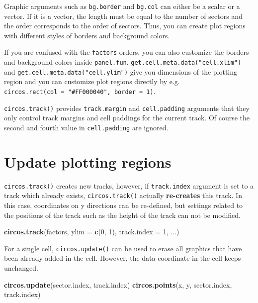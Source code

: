 \documentclass[]{book}
\newenvironment{Shaded}{\begin{snugshade}}{\end{snugshade}}
\newcommand{\KeywordTok}[1]{\textcolor[rgb]{0.13,0.29,0.53}{\textbf{#1}}}
\newcommand{\DataTypeTok}[1]{\textcolor[rgb]{0.13,0.29,0.53}{#1}}
\newcommand{\DecValTok}[1]{\textcolor[rgb]{0.00,0.00,0.81}{#1}}
\newcommand{\NormalTok}[1]{#1}
\begin{document}
Graphic arguments such as \texttt{bg.border} and \texttt{bg.col} can
either be a scalar or a vector. If it is a vector, the length must be
equal to the number of sectors and the order corresponds to the order of
sectors. Thus, you can create plot regions with different styles of
borders and background colors.

If you are confused with the \texttt{factors} orders, you can also
customize the borders and background colors inside \texttt{panel.fun}.
\texttt{get.cell.meta.data("cell.xlim")} and
\texttt{get.cell.meta.data("cell.ylim")} give you dimensions of the
plotting region and you can customize plot regions directly by e.g.
\texttt{circos.rect(col\ =\ "\#FF000040",\ border\ =\ 1)}.

\texttt{circos.track()} provides \texttt{track.margin} and
\texttt{cell.padding} arguments that they only control track margins and
cell paddings for the current track. Of course the second and fourth
value in \texttt{cell.padding} are ignored.

\section{Update plotting regions}\label{update-plotting-regions}

\texttt{circos.track()} creates new tracks, however, if
\texttt{track.index} argument is set to a track which already exists,
\texttt{circos.track()} actually \textbf{re-creates} this track. In this
case, coordinates on y directions can be re-defined, but settings
related to the positions of the track such as the height of the track
can not be modified.

\begin{Shaded}
\begin{Highlighting}[]
\KeywordTok{circos.track}\NormalTok{(factors, }\DataTypeTok{ylim =} \KeywordTok{c}\NormalTok{(}\DecValTok{0}\NormalTok{, }\DecValTok{1}\NormalTok{), }\DataTypeTok{track.index =} \DecValTok{1}\NormalTok{, ...)}
\end{Highlighting}
\end{Shaded}

For a single cell, \texttt{circos.update()} can be used to erase all
graphics that have been already added in the cell. However, the data
coordinate in the cell keeps unchanged.

\begin{Shaded}
\begin{Highlighting}[]
\KeywordTok{circos.update}\NormalTok{(sector.index, track.index)}
\KeywordTok{circos.points}\NormalTok{(x, y, sector.index, track.index)}
\end{Highlighting}
\end{Shaded}
\end{document}
